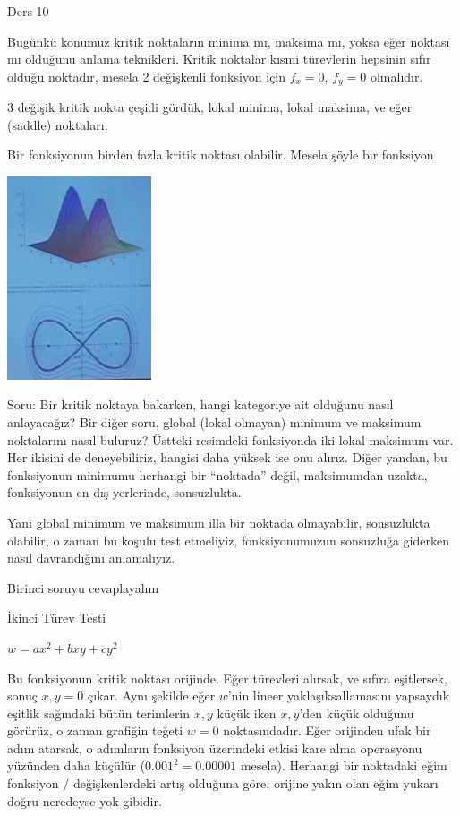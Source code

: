\documentclass[12pt,fleqn]{article}\usepackage{../../common}
\begin{document}
Ders 10

Bugünkü konumuz kritik noktaların minima mı, maksima mı, yoksa eğer noktası
mı olduğunu anlama teknikleri. Kritik noktalar kısmi türevlerin hepsinin
sıfır olduğu noktadır, mesela 2 değişkenli fonksiyon için $f_x=0$, $f_y=0$
olmalıdır. 

3 değişik kritik nokta çeşidi gördük, lokal minima, lokal maksima, ve
eğer (saddle) noktaları. 

Bir fonksiyonun birden fazla kritik noktası olabilir. Mesela şöyle bir
fonksiyon

\includegraphics[height=6cm]{10_1.png}

Soru: Bir kritik noktaya bakarken, hangi kategoriye ait olduğunu nasıl
anlayacağız? Bir diğer soru, global (lokal olmayan) minimum ve maksimum
noktalarını nasıl buluruz?  Üstteki resimdeki fonksiyonda iki lokal maksimum
var. Her ikisini de deneyebiliriz, hangisi daha yüksek ise onu alırız. Diğer
yandan, bu fonksiyonun minimumu herhangi bir ``noktada'' değil, maksimumdan
uzakta, fonksiyonun en dış yerlerinde, sonsuzlukta.

Yani global minimum ve maksimum illa bir noktada olmayabilir, sonsuzlukta
olabilir, o zaman bu koşulu test etmeliyiz, fonksiyonumuzun sonsuzluğa
giderken nasıl davrandığını anlamalıyız.

Birinci soruyu cevaplayalım

İkinci Türev Testi

$w = ax^2 + bxy + cy^2$

Bu fonksiyonun kritik noktası orijinde. Eğer türevleri alırsak, ve sıfıra
eşitlersek, sonuç $x,y=0$ çıkar. Aynı şekilde eğer $w$'nin lineer
yaklaşıksallamasını yapsaydık eşitlik sağındaki bütün terimlerin $x,y$ küçük
iken $x,y$'den küçük olduğunu görürüz, o zaman grafiğin teğeti $w=0$
noktasındadır. Eğer orijinden ufak bir adım atarsak, o adımların fonksiyon
üzerindeki etkisi kare alma operasyonu yüzünden daha küçülür ($0.001^2 =
0.00001$ mesela). Herhangi bir noktadaki eğim fonksiyon / değişkenlerdeki artış
olduğuna göre, orijine yakın olan eğim yukarı doğru neredeyse yok gibidir.
\end{document}
